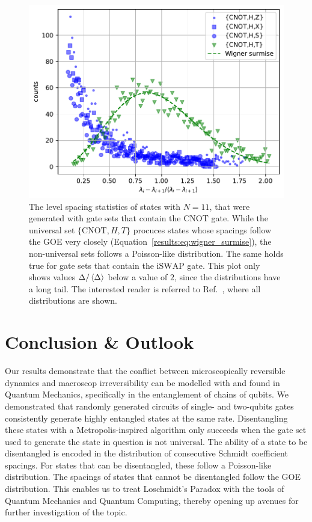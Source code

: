 \documentclass[reprint,amsmath,amssymb,aps,prb,nofootinbib]{revtex4-2}
\begin{document}
    \begin{figure}[htb]
        \includegraphics[width=\columnwidth]{plots/level_spacing_head_CNOT.pdf}
        \caption{The level spacing statistics of states with $N=11$, that were generated with gate sets that contain
        the $\text{CNOT}$ gate. While the universal set $\{\text{CNOT},H,T\}$ procuces states whose spacings follow the
        GOE very closely (Equation~\ref{results:eq:wigner_surmise}), the non-universal sets follows a Poisson-like
        distribution. The same holds true for gate sets that contain the $\text{iSWAP}$ gate. This plot only shows
        values $\Delta/\braket{\Delta}$ below a value of $2$, since the distributions have a long tail. The interested
        reader is referred to Ref.~\cite{Kuehne:2024:EntanglementCooling}, where all distributions are shown.}
        \label{results:fig:level_spacing_head_CNOT}
    \end{figure}

    \section{Conclusion \& Outlook}
    \label{sec:outlook}

    Our results demonstrate that the conflict between microscopically reversible dynamics and macroscop irreversibility
    can be modelled with and found in Quantum Mechanics, specifically in the entanglement of chains of qubits. We demonstrated
    that randomly generated circuits of single- and two-qubits gates consistently generate highly entangled states at the
    same rate. Disentangling these states with a Metropolis-inspired algorithm only succeeds when the gate set used to
    generate the state in question is not universal. The ability of a state to be disentangled is encoded in the distribution
    of consecutive Schmidt coefficient spacings. For states that can be disentangled, these follow a Poisson-like
    distribution. The spacings of states that cannot be disentangled follow the GOE distribution. This enables us to
    treat Loschmidt's Paradox with the tools of Quantum Mechanics and Quantum Computing, thereby opening up avenues for
    further investigation of the topic.
\end{document}
